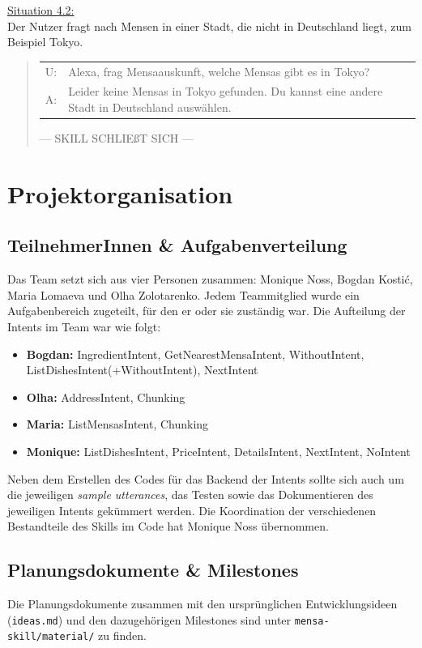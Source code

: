 \documentclass[12pt]{article}
\begin{document}
\ul{Situation 4.2:}\\Der Nutzer fragt nach Mensen in einer Stadt, die nicht in Deutschland liegt, zum Beispiel Tokyo.
\begin{quote}
\begin{tabular}{lp{12cm}}
  U:& Alexa, frag Mensaauskunft, welche Mensas gibt es in Tokyo?\\
  A:& Leider keine Mensas in Tokyo gefunden. Du kannst eine andere Stadt in Deutschland auswählen.\\[0.2cm]
\end{tabular}
--- SKILL SCHLIEßT SICH ---\\
\end{quote}

\section{Projektorganisation}
\subsection{TeilnehmerInnen \& Aufgabenverteilung}
Das Team setzt sich aus vier Personen zusammen: Monique Noss, Bogdan Kostić, Maria Lomaeva und Olha Zolotarenko. 
Jedem Teammitglied wurde ein Aufgabenbereich zugeteilt, für den er oder sie zuständig war.
Die Aufteilung der Intents im Team war wie folgt:
\begin{itemize}
  \setlength\itemsep{0em}
  \item \textbf{Bogdan:} IngredientIntent, GetNearestMensaIntent, WithoutIntent, ListDishesIntent(+WithoutIntent), NextIntent
  \item \textbf{Olha:} AddressIntent, Chunking
  \item \textbf{Maria:} ListMensasIntent, Chunking
  \item \textbf{Monique:} ListDishesIntent, PriceIntent, DetailsIntent, NextIntent, NoIntent
\end{itemize}

Neben dem Erstellen des Codes für das Backend der Intents sollte sich auch um die jeweiligen \emph{sample utterances}, das Testen sowie das Dokumentieren des jeweiligen Intents gekümmert werden.
Die Koordination der verschiedenen Bestandteile des Skills im Code hat Monique Noss übernommen.

\subsection{Planungsdokumente \& Milestones}
Die Planungsdokumente zusammen mit den ursprünglichen Entwicklungsideen (\texttt{ideas.md}) und den dazugehörigen Milestones sind unter \texttt{mensa-skill/material/} zu finden. 
\end{document}
